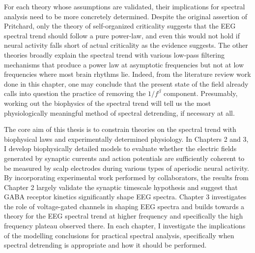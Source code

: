 For each theory whose assumptions are validated, their implications for spectral analysis need to be more concretely determined. Despite the original assertion of Pritchard, only the theory of self-organized criticality suggests that the EEG spectral trend should follow a pure power-law, and even this would not hold if neural activity falls short of actual criticality as the evidence suggests. The other theories broadly explain the spectral trend with various low-pass filtering mechanisms that produce a power law at asymptotic frequencies but not at low frequencies where most brain rhythms lie. Indeed, from the literature review work done in this chapter, one may conclude that the present state of the field already calls into question the practice of removing the $1/f^\beta$ component. Presumably, working out the biophysics of the spectral trend will tell us the most physiologically meaningful method of spectral detrending, if necessary at all.

The core aim of this thesis is to constrain theories on the spectral trend with biophysical laws and experimentally determined physiology. In Chapters 2 and 3, I develop biophysically detailed models to evaluate whether the electric fields generated by synaptic currents and action potentials are sufficiently coherent to be measured by scalp electrodes during various types of aperiodic neural activity. By incorporating experimental work performed by collaborators, the results from Chapter 2 largely validate the synaptic timescale hypothesis and suggest that GABA receptor kinetics significantly shape EEG spectra. Chapter 3 investigates the role of voltage-gated channels in shaping EEG spectra and builds towards a theory for the EEG spectral trend at higher frequency and specifically the high frequency plateau observed there. In each chapter, I investigate the implications of the modelling conclusions for practical spectral analysis, specifically when spectral detrending is appropriate and how it should be performed.